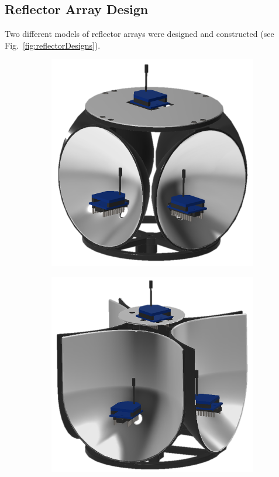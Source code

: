 \documentclass[conference]{IEEEtran}
\begin{document}
\subsection{Reflector Array Design}
\label{sec:reflectorArrayDesign}
Two different models of reflector arrays were designed and constructed (see Fig.~\ref{fig:reflectorDesigns}). %
%
\begin{figure}[htbp]
  \centering
  \begin{subfigure}[b]{0.45\linewidth}
    \centering
    \includegraphics[width=\textwidth]{figs/img/paraboloidalReflector.png}
    \caption{}
    \label{fig:paraboloidalReflector}
  \end{subfigure}
  \begin{subfigure}[b]{0.45\linewidth}
    \centering
    \includegraphics[width=\textwidth]{figs/img/parabolicReflector.png}

\end{subfigure}
\end{figure}
\end{document}

